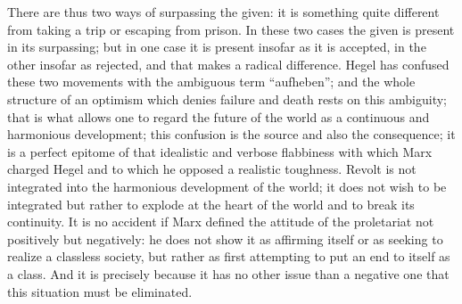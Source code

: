 \documentclass[11pt]{article}
\begin{document}
{{There are thus two ways of surpassing the given: it is something quite different from taking a trip or escaping from prison. In these two cases the given is present in its surpassing; but in one case it is present insofar as it is accepted, in the other insofar as rejected, and that makes a radical difference. Hegel has confused these two movements with the ambiguous term “aufheben”; and the whole structure of an optimism which denies failure and death rests on this ambiguity; that is what allows one to regard the future of the world as a continuous and harmonious development; this confusion is the source and also the consequence; it is a perfect epitome of that idealistic and verbose flabbiness with which Marx charged Hegel and to which he opposed a realistic toughness. Revolt is not integrated into the harmonious development of the world; it does not wish to be integrated but rather to explode at the heart of the world and to break its continuity. It is no accident if Marx defined the attitude of the proletariat not positively but negatively: he does not show it as affirming itself or as seeking to realize a classless society, but rather as first attempting to put an end to itself as a class. And it is precisely because it has no other issue than a negative one that this situation must be eliminated.

}}
\end{document}
